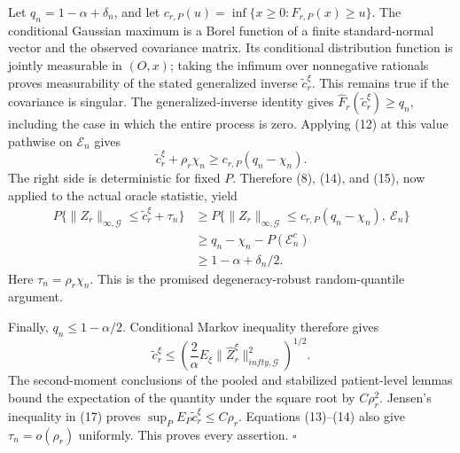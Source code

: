 Let \(q_n=1-\alpha+\delta_n\), and let
\(c_{r,P}(u)=\inf\{x\ge0:F_{r,P}(x)\ge u\}\).  The conditional Gaussian
maximum is a Borel function of a finite standard-normal vector and the
observed covariance matrix.  Its conditional distribution function is
jointly measurable in \((O,x)\); taking the infimum over nonnegative
rationals proves measurability of the stated generalized inverse
\(\widetilde c_r^\xi\).  This remains true if the covariance is singular.
The generalized-inverse identity gives
\(\widehat F_r(\widetilde c_r^\xi)\ge q_n\), including the case in which
the entire process is zero.  Applying (12) at this value pathwise on
\(\mathcal E_n\) gives
\[
 \widetilde c_r^\xi+\rho_r\chi_n
 \ge c_{r,P}(q_n-\chi_n).                                  \tag{15}
\]
The right side is deterministic for fixed \(P\).  Therefore (8), (14), and
(15), now applied to the actual oracle statistic, yield
\[
\begin{aligned}
 P\{\|Z_r\|_{\infty,\mathcal G}
       \le\widetilde c_r^\xi+\tau_n\}
 &\ge P\{\|Z_r\|_{\infty,\mathcal G}
       \le c_{r,P}(q_n-\chi_n),\ \mathcal E_n\}\\
 &\ge q_n-\chi_n-P(\mathcal E_n^c)\\
 &\ge1-\alpha+\delta_n/2.                                 \tag{16}
\end{aligned}
\]
Here \(\tau_n=\rho_r\chi_n\).  This is the promised degeneracy-robust
random-quantile argument.

Finally, \(q_n\le1-\alpha/2\).  Conditional Markov inequality therefore
gives
\[
 \widetilde c_r^\xi
 \le\left(\frac{2}{\alpha}
 E_\xi\|\widehat Z_r^\xi\|_{infty,\mathcal G}^2\right)^{1/2}. \tag{17}
\]
The second-moment conclusions of the pooled and stabilized patient-level
lemmas bound the expectation of the quantity under the square root by
\(C\rho_r^2\).  Jensen's inequality in (17) proves
\(\sup_PE_P\widetilde c_r^\xi\le C\rho_r\).  Equations (13)--(14) also
give \(\tau_n=o(\rho_r)\) uniformly.  This proves every assertion. \(\square\)